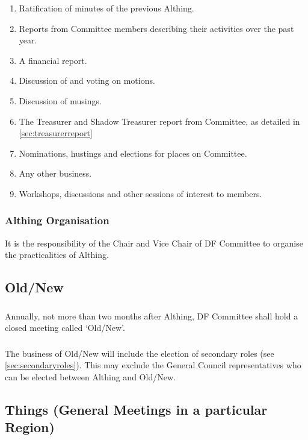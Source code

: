\documentclass[a4paper, 11pt]{report}
\begin{document}
\begin{enumerate}
\item Ratification of minutes of the previous Althing.
\item Reports from Committee members describing their activities over the past year.
\item A financial report.
\item Discussion of and voting on motions.
\item Discussion of musings.
\item The Treasurer and Shadow Treasurer report from Committee, as detailed in \ref{sec:treasurerreport}
\item Nominations, hustings and elections for places on Committee.
\item Any other business.
\item Workshops, discussions and other sessions of interest to members.
\end{enumerate}

\subsubsection{Althing Organisation}
It is the responsibility of the Chair and Vice Chair of DF Committee to organise the practicalities of Althing.


\subsection{Old/New}
\label{sec:oldnew}
\subsubsection{} Annually, not more than two months after Althing, DF Committee shall hold a closed meeting called `Old/New'.

\subsubsection{} The business of Old/New will include the election of secondary roles (see \ref{sec:secondaryroles}). This may exclude the General Council representatives who can be elected between Althing and Old/New.

\subsection{Things (General Meetings in a particular Region)}
\end{document}
